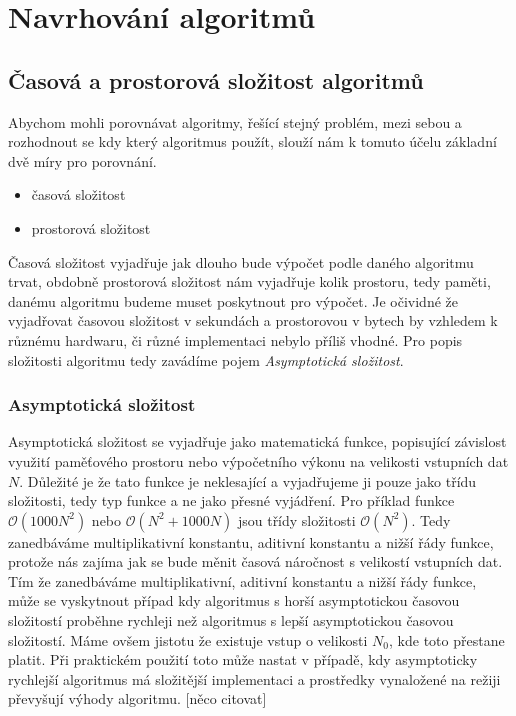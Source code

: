 \chapter{Navrhování algoritmů}

\section{Časová a prostorová složitost algoritmů}
	Abychom mohli porovnávat algoritmy, řešící stejný problém, mezi sebou a rozhodnout se kdy který algoritmus použít, slouží nám k tomuto účelu základní dvě míry pro porovnání.
\begin{itemize}
	\item časová složitost
	\item prostorová složitost
\end{itemize}
	Časová složitost vyjadřuje jak dlouho bude výpočet podle daného algoritmu trvat, obdobně prostorová složitost nám vyjadřuje kolik prostoru, tedy paměti, danému algoritmu budeme muset poskytnout pro výpočet. Je očividné že vyjadřovat časovou složitost v sekundách a prostorovou v bytech by vzhledem k různému hardwaru, či různé implementaci nebylo příliš vhodné. Pro popis složitosti algoritmu tedy zavádíme pojem \textit{Asymptotická složitost}.
	
\subsection{Asymptotická složitost}
	Asymptotická složitost se vyjadřuje jako matematická funkce, popisující závislost využití paměťového prostoru nebo výpočetního výkonu na velikosti vstupních dat $N$. Důležité je že tato funkce je neklesající a vyjadřujeme ji pouze jako třídu složitosti, tedy typ funkce a ne jako přesné vyjádření. Pro příklad funkce $\mathcal{O} (1000N^2) $ nebo $\mathcal{O} (N^2 + 1000N)$ jsou třídy složitosti $\mathcal{O} (N^2)$. Tedy zanedbáváme multiplikativní konstantu, aditivní konstantu a nižší řády funkce, protože nás zajíma jak se bude měnit časová náročnost s velikostí vstupních dat.
	Tím že zanedbáváme multiplikativní, aditivní konstantu a nižší řády funkce, může se vyskytnout případ kdy algoritmus s horší asymptotickou časovou složitostí proběhne rychleji než algoritmus s lepší asymptotickou časovou složitostí. Máme ovšem jistotu že existuje vstup o velikosti $N_0$, kde toto přestane platit. Při praktickém použití toto může nastat v případě, kdy asymptoticky rychlejší algoritmus má složitější implementaci a prostředky vynaložené na režiji převyšují výhody algoritmu. [něco citovat]
	
